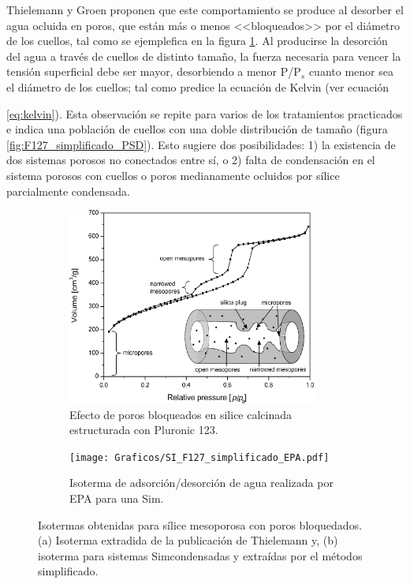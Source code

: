 			Thielemann \cite{Thielemann2011} y Groen\cite{Groen2003} proponen que este comportamiento se produce al desorber el agua ocluida en poros, que están más o menos <<bloqueados>> por el diámetro de los cuellos, tal como se ejemplefica en la figura \ref{fig:thielemann}. Al producirse la desorción del agua a través de cuellos de distinto tamaño, la fuerza  necesaria para vencer la tensión superficial debe ser mayor, desorbiendo a menor P/P$_s$ cuanto menor sea el diámetro de los cuellos; tal como predice la ecuación de Kelvin (ver ecuación {\ref{eq:kelvin}). Esta observación se repite para varios de los tratamientos practicados e indica una población de cuellos con una doble distribución de tamaño (figura \ref{fig:F127_simplificado_PSD}). Esto sugiere dos posibilidades: 1) la existencia de dos sistemas porosos no conectados entre sí, o 2) falta de condensación en el sistema porosos con cuellos o poros medianamente ocluidos por sílice parcialmente condensada.

			\begin{figure}[th]
		 	   	    \begin{subfigure}[t]{0.49\textwidth}
			       	\includegraphics[width=0.90\textwidth]{Graficos/Doble-distr.png}
			       	\caption{Efecto de poros bloqueados en silice calcinada estructurada con Pluronic 123.}
			       	\label{fig:thielemann}
			   		\end{subfigure}
			   		\begin{subfigure}[t]{0.49\textwidth}
			   	    \texttt{[image: Graficos/SI\_F127\_simplificado\_EPA.pdf]}
			   	    \caption{Isoterma de adsorción/desorción de agua realizada por EPA para una Sim\pdmF.}
			   		\end{subfigure}
					 \caption[Microscopías \pdmF\space tratamiento simplificado.]{Isotermas obtenidas para sílice mesoporosa con poros bloquedados. (a) Isoterma extradida de la publicación de Thielemann\cite{Thielemann2011} y, (b) isoterma para sistemas Sim\pdmF\space condensadas y extraídas por el métodos simplificado.}
					 \label{fig:F127_simplificado_EPA_2}	
				     \end{figure}

}

